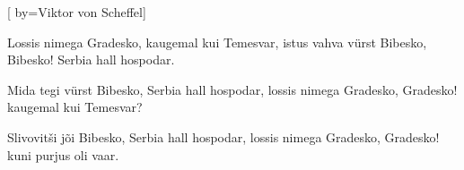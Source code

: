 
[
	by={Viktor von Scheffel}]
  
\beginverse*
Lossis nimega Gradesko,
kaugemal kui Temesvar,
istus vahva vürst Bibesko, Bibesko!
Serbia hall hospodar. 
\endverse

\beginverse*
Mida tegi vürst Bibesko,
Serbia hall hospodar,
lossis nimega Gradesko, Gradesko!
kaugemal kui Temesvar?
\endverse

\beginverse*
Slivovitši jõi Bibesko,
Serbia hall hospodar,
lossis nimega Gradesko, Gradesko!
kuni purjus oli vaar.
\endverse
\endsong

